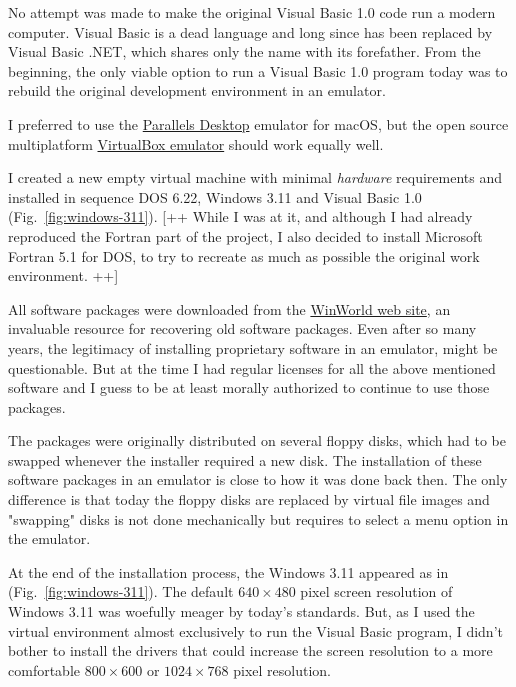 No attempt was made to make the original Visual Basic 1.0 code run a modern computer. Visual Basic is a dead language and long since has been replaced by Visual Basic .NET, which shares only the name with its forefather. From the beginning, the only viable option to run a Visual Basic 1.0 program today was to rebuild the original development environment in an emulator.

I preferred to use the \href{https://www.parallels.com/}{Parallels Desktop} emulator for macOS, but the open source multiplatform \href{https://www.virtualbox.org/}{VirtualBox emulator} should work equally well.

I created a new empty virtual machine with minimal \emph{hardware} requirements and installed in sequence DOS 6.22, Windows 3.11 and Visual Basic 1.0 (Fig.~\ref{fig:windows-311}).
[++ While I was at it, and although I had already reproduced the Fortran part of the project, I also decided to install Microsoft Fortran 5.1 for DOS, to try to recreate as much as possible the original work environment. ++]

All software packages were downloaded from the \href{https://winworldpc.com}{WinWorld web site}, an invaluable resource for recovering old software packages. 
Even after so many years, the legitimacy of installing proprietary software in an emulator, might be questionable. But at the time I had regular licenses for all the above mentioned software and I guess to be at least morally authorized to continue to use those packages.

The packages were originally distributed on several floppy disks, which had to be swapped whenever the installer required a new disk. 
The installation of these software packages in an emulator is close to how it was done back then.
The only difference is that today the floppy disks are replaced by virtual file images and "swapping" disks is not done mechanically but requires to select a menu option in the emulator.

At the end of the installation process, the Windows 3.11 appeared as in (Fig.~\ref{fig:windows-311}).
The default $640 \times 480$ pixel screen resolution of Windows 3.11 was woefully meager by today's standards.
But, as I used the virtual environment almost exclusively to run the Visual Basic program, I didn't bother to install the drivers that could increase the screen resolution to a more comfortable $800 \times 600$ or $1024 \times 768$ pixel resolution.


